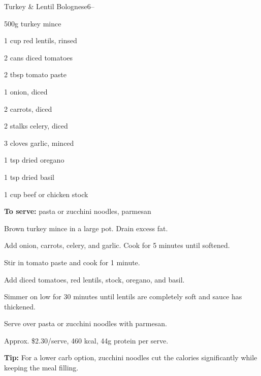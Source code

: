 \begin{recipebox}{Turkey \& Lentil Bolognese}{6}{--}
\begin{ingredients}
  \item 500g turkey mince
  \item 1 cup red lentils, rinsed
  \item 2 cans diced tomatoes
  \item 2 tbsp tomato paste
  \item 1 onion, diced
  \item 2 carrots, diced
  \item 2 stalks celery, diced
  \item 3 cloves garlic, minced
  \item 1 tsp dried oregano
  \item 1 tsp dried basil
  \item 1 cup beef or chicken stock
  \item \textbf{To serve:} pasta or zucchini noodles, parmesan
\end{ingredients}

\begin{method}
  \item Brown turkey mince in a large pot. Drain excess fat.
  \item Add onion, carrots, celery, and garlic. Cook for 5 minutes until softened.
  \item Stir in tomato paste and cook for 1 minute.
  \item Add diced tomatoes, red lentils, stock, oregano, and basil.
  \item Simmer on low for 30 minutes until lentils are completely soft and sauce has thickened.
  \item Serve over pasta or zucchini noodles with parmesan.
\end{method}


\begin{notelist}
  \item Approx. \$2.30/serve, 460 kcal, 44g protein per serve.
  \item \textbf{Tip:} For a lower carb option, zucchini noodles cut the calories significantly while keeping the meal filling.
\end{notelist}
\end{recipebox}
